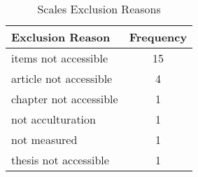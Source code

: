 \begin{table}
\begin{minipage}[t][\textheight][t]{\textwidth}

\caption{\label{tab:ScalesExclusion}Scales Exclusion Reasons}
\begin{tabular}[t]{lc}
\toprule
Exclusion Reason & Frequency\\
\midrule
items not accessible & 15\\
article not accessible & 4\\
chapter not accessible & 1\\
not acculturation & 1\\
not measured & 1\\
thesis not accessible & 1\\
\bottomrule
\end{tabular}
\end{minipage}
\end{table}
